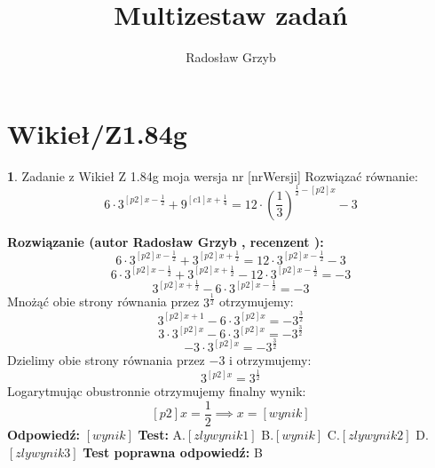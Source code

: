 \documentclass[12pt, a4paper]{article}
\title{Multizestaw zadań}
\author{Radosław Grzyb}
\date{}
\theoremstyle{definition} %
\newtheorem{zad}{}
\newcommand{\kategoria}[1]{\section{#1}} %
\newcommand{\zadStart}[1]{\begin{zad}#1\newline} %
\newcommand{\zadStop}{\end{zad}}   %
\newcommand{\rozwStart}[2]{\noindent \textbf{Rozwiązanie (autor #1 , recenzent #2): }\newline} %
\newcommand{\rozwStop}{\newline}                                            %
\newcommand{\odpStart}{\noindent \textbf{Odpowiedź:}\newline}    %
\newcommand{\odpStop}{\newline}                                             %
\newcommand{\testStart}{\noindent \textbf{Test:}\newline} %
\newcommand{\testStop}{\newline} %
\newcommand{\kluczStart}{\noindent \textbf{Test poprawna odpowiedź:}\newline} %
\newcommand{\kluczStop}{\newline} %
\begin{document}
\maketitle
\kategoria{Wikieł/Z1.84g}
\zadStart{Zadanie z Wikieł Z 1.84g moja wersja nr [nrWersji]}
Rozwiązać równanie:
$$6\cdot3^{[p2]x-\frac{1}{2}}+9^{[c1]x+\frac{1}{4}}=12\cdot\left(\frac{1}{3}\right)^{\frac{1}{2}-[p2]x}-3$$
\zadStop
\rozwStart{Radosław Grzyb}{}
$$6\cdot3^{[p2]x-\frac{1}{2}}+3^{[p2]x+\frac{1}{2}}=12\cdot3^{[p2]x-\frac{1}{2}}-3$$
$$6\cdot3^{[p2]x-\frac{1}{2}}+3^{[p2]x+\frac{1}{2}}-12\cdot3^{[p2]x-\frac{1}{2}}=-3$$
$$3^{[p2]x+\frac{1}{2}}-6\cdot3^{[p2]x-\frac{1}{2}}=-3$$
Mnożąć obie strony równania przez $3^{\frac{1}{2}}$ otrzymujemy:
$$3^{[p2]x+1}-6\cdot3^{[p2]x}=-3^{\frac{3}{2}}$$
$$3\cdot3^{[p2]x}-6\cdot3^{[p2]x}=-3^{\frac{3}{2}}$$
$$-3\cdot3^{[p2]x}=-3^{\frac{3}{2}}$$
Dzielimy obie strony równania przez $-3$ i otrzymujemy:
$$3^{[p2]x}=3^{\frac{1}{2}}$$
Logarytmując obustronnie otrzymujemy finalny wynik:
$$[p2]x=\frac{1}{2}\implies x=[wynik]$$
\rozwStop
\odpStart
$[wynik]$
\odpStop
\testStart
A.$[zlywynik1]$
B.$[wynik]$
C.$[zlywynik2]$
D.$[zlywynik3]$
\testStop
\kluczStart
B
\kluczStop
\end{document}

